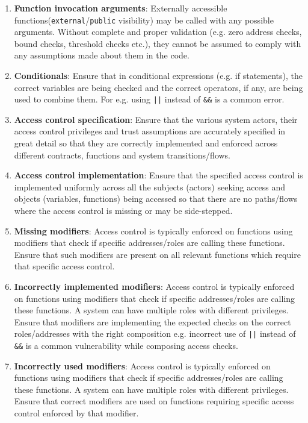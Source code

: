 \begin{enumerate}
\item\textbf{Function invocation arguments}: Externally accessible functions\linebreak (\verb|external|/\verb|public| visibility) may be called with any possible arguments. Without complete and proper validation (e.g. zero address checks, bound checks, threshold checks etc.), they cannot be assumed to comply with any assumptions made about them in the code.

\item\textbf{Conditionals}: Ensure that in conditional expressions (e.g. if statements), the correct variables are being checked and the correct operators, if any, are being used to combine them. For e.g. using \verb!||! instead of \verb|&&| is a common error.

\item\textbf{Access control specification}: Ensure that the various system actors, their access control privileges and trust assumptions are accurately specified in great detail so that they are correctly implemented and enforced across different contracts, functions and system transitions/flows.

\item\textbf{Access control implementation}: Ensure that the specified access control is implemented uniformly across all the subjects (actors) seeking access and objects (variables, functions) being accessed so that there are no paths/flows where the access control is missing or may be side-stepped.

\item\textbf{Missing modifiers}: Access control is typically enforced on functions using modifiers that check if specific addresses/roles are calling these functions. Ensure that such modifiers are present on all relevant functions which require that specific access control.

\item\textbf{Incorrectly implemented modifiers}: Access control is typically enforced on functions using modifiers that check if specific addresses/roles are calling these functions. A system can have multiple roles with different privileges. Ensure that modifiers are implementing the expected checks on the correct roles/addresses with the right composition e.g. incorrect use of \verb!||! instead of \verb|&&| is a common vulnerability while composing access checks.

\item\textbf{Incorrectly used modifiers}: Access control is typically enforced on functions using modifiers that check if specific addresses/roles are calling these functions. A system can have multiple roles with different privileges. Ensure that correct modifiers are used on functions requiring specific access control enforced by that modifier.


\end{enumerate}
